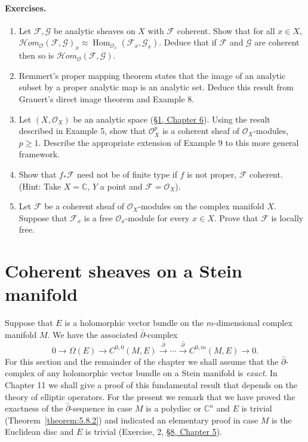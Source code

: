 \paragraph{Exercises.}
\begin{enumerate}[label=\arabic*.]
\item Let $\mathcal{F},\mathcal{G}$ be analytic sheaves on $X$ with $\mathcal{F}$ coherent. Show that for all $x\in X$, $\mathcal{H}om_{\mathcal{O}}(\mathcal{F},\mathcal{G})_x\approx\operatorname{Hom}_{\mathcal{O}_x}(\mathcal{F}_x,\mathcal{G}_x)$. Deduce that if $\mathcal{F}$ and $\mathcal{G}$ are coherent then so is $\mathcal{H}om_{\mathcal{O}}(\mathcal{F},\mathcal{G})$.
\item Remmert's proper mapping theorem states that the image of an analytic subset by a proper analytic map is an analytic set. Deduce this result from Grauert's direct image theorem and Example 8.
\item Let $(X,\mathcal{O}_X)$ be an analytic space (\hyperref[sec:6:1]{\S1, Chapter 6}). Using the result described in Example 5, show that $\mathcal{O}_X^p$ is a coherent sheaf of $\mathcal{O}_X$-modules, $p\geq1$. Describe the appropriate extension of Example 9 to this more general framework.
\item Show that $f_*\mathcal{F}$ need not be of finite type if $f$ is not proper, $\mathcal{F}$ coherent. (Hint: Take $X=\mathbb{C}$, $Y$ a point and $\mathcal{F}=\mathcal{O}_X$).
\item Let $\mathcal{F}$ be a coherent sheaf of $\mathcal{O}_X$-modules on the complex manifold $X$. Suppose that $\mathcal{F}_x$ is a free $\mathcal{O}_x$-module for every $x\in X$. Prove that $\mathcal{F}$ is locally free.
\end{enumerate}
\section{Coherent sheaves on a Stein manifold}\label{sec:7:2}
Suppose that $E$ is a holomorphic vector bundle on the $m$-dimensional complex manifold $M$. We have the associated $\bar\partial$-complex
\[
0\to\Omega(E)\to C^{0,0}(M,E)\xrightarrow{\bar\partial}\cdots\xrightarrow{\bar\partial}C^{0,m}(M,E)\to0.
\]
For this section and the remainder of the chapter we shall assume that the $\bar\partial$-complex of any holomorphic vector bundle on a Stein manifold is \emph{exact}. In Chapter 11 we shall give a proof of this fundamental result that depends on the theory of elliptic operators. For the present we remark that we have proved the exactness of the $\bar\partial$-sequence in case $M$ is a polydisc or $\mathbb{C}^n$ and $E$ is trivial (Theorem~\ref{theorem:5.8.2}) and indicated an elementary proof in case $M$ is the Euclidean disc and $E$ is trivial (Exercise, 2, \hyperref[sec:5:8]{\S8, Chapter 5}).

